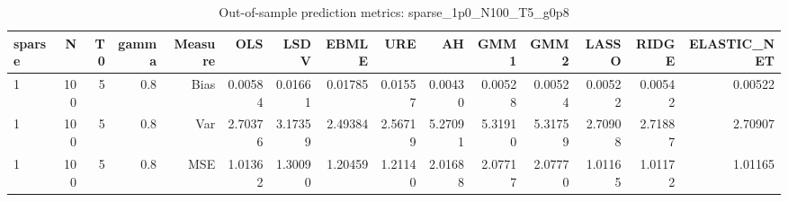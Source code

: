 \begin{table}[!htbp]\centering
\caption{Out-of-sample prediction metrics: sparse_1p0_N100_T5_g0p8}
\label{tab:table3_sparse_1p0_N100_T5_g0p8}
\begin{tabular}{lrrrrrrrrrrrrrr}
\hline
sparse & N & T0 & gamma & Measure & OLS & LSDV & EBMLE & URE & AH & GMM1 & GMM2 & LASSO & RIDGE & ELASTIC_NET \\
\hline
1 & 100 & 5 & 0.8 & Bias & 0.00584 & 0.01661 & 0.01785 & 0.01557 & 0.00430 & 0.00528 & 0.00524 & 0.00522 & 0.00542 & 0.00522 \\
1 & 100 & 5 & 0.8 & Var & 2.70376 & 3.17359 & 2.49384 & 2.56719 & 5.27091 & 5.31910 & 5.31759 & 2.70908 & 2.71887 & 2.70907 \\
1 & 100 & 5 & 0.8 & MSE & 1.01362 & 1.30090 & 1.20459 & 1.21140 & 2.01688 & 2.07717 & 2.07770 & 1.01165 & 1.01172 & 1.01165 \\
\hline
\end{tabular}
\end{table}

